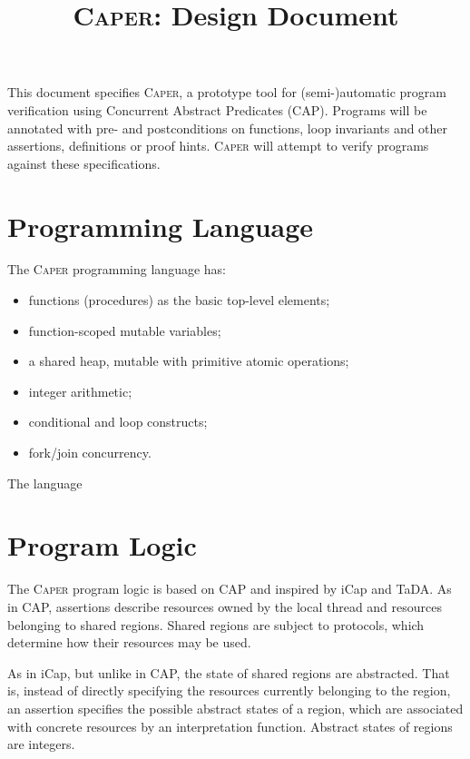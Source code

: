 \documentclass[a4paper]{article}
\begin{document}
\title{\textsc{Caper}: Design Document}
\author{}

\maketitle

This document specifies \textsc{Caper}, a prototype tool for (semi-)automatic program verification using Concurrent Abstract Predicates (CAP).
Programs will be annotated with pre- and postconditions on functions, loop invariants and other assertions, definitions or proof hints.
\textsc{Caper} will attempt to verify programs against these specifications.

\section{Programming Language}

The \textsc{Caper} programming language has:
\begin{itemize}
  \item functions (procedures) as the basic top-level elements;
  \item function-scoped mutable variables;
  \item a shared heap, mutable with primitive atomic operations;
  \item integer arithmetic;
  \item conditional and loop constructs;
  \item fork/join concurrency.
\end{itemize}

The language 

\section{Program Logic}

The \textsc{Caper} program logic is based on CAP and inspired by iCap and TaDA.
As in CAP, assertions describe resources owned by the local thread and resources belonging to shared regions.
Shared regions are subject to protocols, which determine how their resources may be used.

As in iCap, but unlike in CAP, the state of shared regions are abstracted.
That is, instead of directly specifying the resources currently belonging to the region, an assertion specifies the possible abstract states of a region, which are associated with concrete resources by an interpretation function.
Abstract states of regions are integers.
\end{document}
